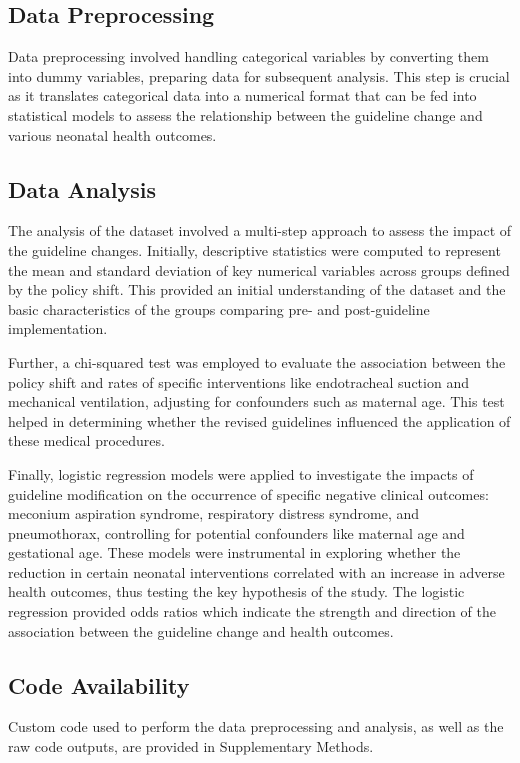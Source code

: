 \documentclass[11pt]{article}
\begin{document}
\subsection*{Data Preprocessing}
Data preprocessing involved handling categorical variables by converting them into dummy variables, preparing data for subsequent analysis. This step is crucial as it translates categorical data into a numerical format that can be fed into statistical models to assess the relationship between the guideline change and various neonatal health outcomes.

\subsection*{Data Analysis}
The analysis of the dataset involved a multi-step approach to assess the impact of the guideline changes. Initially, descriptive statistics were computed to represent the mean and standard deviation of key numerical variables across groups defined by the policy shift. This provided an initial understanding of the dataset and the basic characteristics of the groups comparing pre- and post-guideline implementation.

Further, a chi-squared test was employed to evaluate the association between the policy shift and rates of specific interventions like endotracheal suction and mechanical ventilation, adjusting for confounders such as maternal age. This test helped in determining whether the revised guidelines influenced the application of these medical procedures.

Finally, logistic regression models were applied to investigate the impacts of guideline modification on the occurrence of specific negative clinical outcomes: meconium aspiration syndrome, respiratory distress syndrome, and pneumothorax, controlling for potential confounders like maternal age and gestational age. These models were instrumental in exploring whether the reduction in certain neonatal interventions correlated with an increase in adverse health outcomes, thus testing the key hypothesis of the study. The logistic regression provided odds ratios which indicate the strength and direction of the association between the guideline change and health outcomes.\subsection*{Code Availability}

Custom code used to perform the data preprocessing and analysis, as well as the raw code outputs, are provided in Supplementary Methods.
\end{document}
